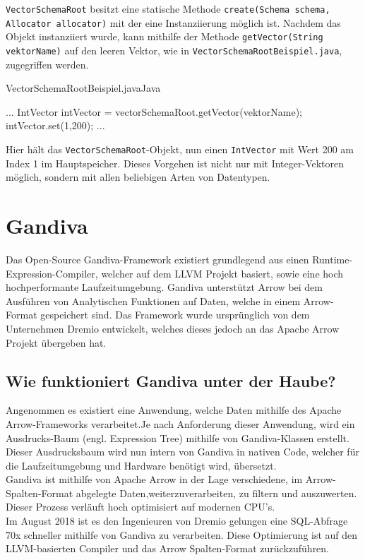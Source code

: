 \texttt{VectorSchemaRoot} besitzt eine statische Methode \texttt{create(Schema schema, Allocator allocator)} mit der eine Instanziierung möglich ist.
Nachdem das Objekt instanziiert wurde, kann mithilfe der Methode \texttt{getVector(String vektorName)} auf den leeren Vektor, wie in \texttt{VectorSchemaRootBeispiel.java}, zugegriffen werden.

\begin{codeblock}{VectorSchemaRootBeispiel.java}{Java}
  \begin{javacode}
...
IntVector intVector = vectorSchemaRoot.getVector(vektorName);
intVector.set(1,200);
...
  \end{javacode}
\end{codeblock}


Hier hält das \texttt{VectorSchemaRoot}-Objekt, nun einen \texttt{IntVector} mit Wert 200 am Index 1 im Hauptspeicher.
Dieses Vorgehen ist nicht nur mit Integer-Vektoren möglich, sondern mit allen beliebigen Arten von Datentypen.


\section{Gandiva}
Das Open-Source Gandiva-Framework existiert grundlegend aus  einen Runtime-Expression-Compiler, welcher auf dem LLVM Projekt basiert, sowie eine hoch hochperformante Laufzeitumgebung.
Gandiva unterstützt Arrow bei dem Ausführen von Analytischen Funktionen auf Daten, welche in einem Arrow-Format gespeichert sind. 
Das Framework wurde ursprünglich von dem Unternehmen Dremio entwickelt, welches dieses jedoch an das Apache Arrow Projekt übergeben hat.\cite{Apache:Gandiva}

\subsection{Wie funktioniert Gandiva unter der Haube?}
Angenommen es existiert eine Anwendung, welche Daten mithilfe des  Apache Arrow-Frameworks verarbeitet.Je nach Anforderung dieser Anwendung, wird ein Ausdrucks-Baum (engl. Expression Tree) mithilfe von Gandiva-Klassen erstellt. Dieser Ausdrucksbaum wird nun intern von Gandiva in nativen Code, welcher für die Laufzeitumgebung und Hardware benötigt wird, übersetzt. \\
Gandiva ist mithilfe von Apache Arrow in der Lage verschiedene, im Arrow-Spalten-Format abgelegte Daten,weiterzuverarbeiten, zu filtern und auszuwerten.
Dieser Prozess verläuft hoch optimisiert auf modernen CPU's.\cite{Apache:Gandiva} \\
Im August 2018 ist es den Ingenieuren von Dremio gelungen eine SQL-Abfrage 70x schneller mithilfe von Gandiva zu verarbeiten. Diese Optimierung ist auf den LLVM-basierten Compiler und das Arrow Spalten-Format zurückzuführen.\cite{Apache:Gandiva:Performance}

